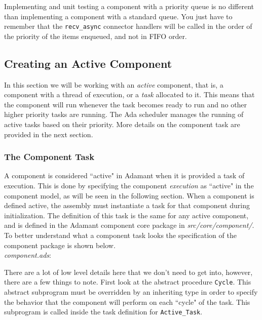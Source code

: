Implementing and unit testing a component with a priority queue is no different than implementing a component with a standard queue. You just have to remember that the \texttt{recv\_async} connector handlers will be called in the order of the priority of the items enqueued, and not in FIFO order. \\

\subsection{Creating an Active Component} \label{Creating an Active Component}

In this section we will be working with an \textit{active} component, that is, a component with a thread of execution, or a \textit{task} allocated to it. This means that the component will run whenever the task becomes ready to run and no other higher priority tasks are running. The Ada scheduler manages the running of active tasks based on their priority. More details on the component task are provided in the next section.

\subsubsection{The Component Task}  \label{The Component Task}

A component is considered ``active" in Adamant when it is provided a task of execution. This is done by specifying the component \textit{execution} as ``active" in the component model, as will be seen in the following section. When a component is defined active, the assembly must instantiate a task for that component during initialization. The definition of this task is the same for any active component, and is defined in the Adamant component core package in \textit{src/core/component/}. To better understand what a component task looks the specification of the component package is shown below. \\

\textit{component.ads}:

There are a lot of low level details here that we don't need to get into, however, there are a few things to note. First look at the abstract procedure \texttt{Cycle}. This abstract subprogram must be overridden by an inheriting type in order to specify the behavior that the component will perform on each ``cycle" of the task. This subprogram is called inside the task definition for \texttt{Active\_Task}. \\

